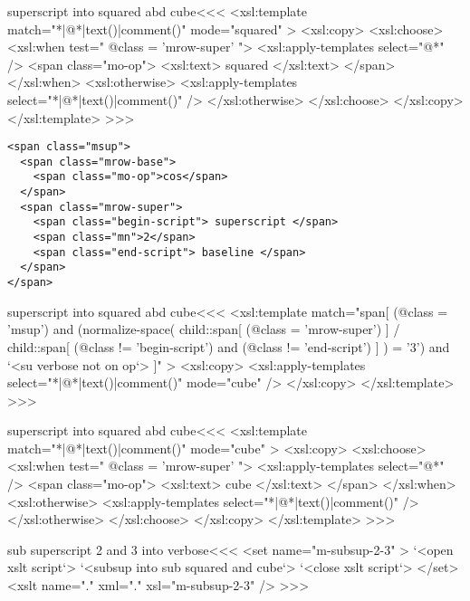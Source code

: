 \documentclass{article}
\begin{document}
\<superscript into squared abd cube\><<<
<xsl:template match="*|@*|text()|comment()" 
                           mode="squared" >
   <xsl:copy>
     <xsl:choose>
        <xsl:when test=" @class = 'mrow-super' ">
           <xsl:apply-templates select="@*" />
           <span class="mo-op">
             <xsl:text> squared </xsl:text>
           </span>
        </xsl:when>  
        <xsl:otherwise>
           <xsl:apply-templates select="*|@*|text()|comment()" />
        </xsl:otherwise>
     </xsl:choose>
   </xsl:copy>
</xsl:template> 
>>>






\begin{verbatim}
<span class="msup">
  <span class="mrow-base">
    <span class="mo-op">cos</span>
  </span>
  <span class="mrow-super">
    <span class="begin-script"> superscript </span>
    <span class="mn">2</span>
    <span class="end-script"> baseline </span>
  </span>
</span>
\end{verbatim}




\<superscript into squared abd cube\><<<
<xsl:template match="span[
    (@class = 'msup') 
  and
    (normalize-space(
      child::span[ (@class = 'mrow-super') ] 
        / child::span[ (@class != 'begin-script')
                       and
                       (@class != 'end-script')
                     ]
     ) = '3')
  and `<su verbose not on op`>
]" >
   <xsl:copy>
      <xsl:apply-templates select="*|@*|text()|comment()" 
                           mode="cube" />
   </xsl:copy>
</xsl:template> 
>>>



\<superscript into squared abd cube\><<<
<xsl:template match="*|@*|text()|comment()" 
                           mode="cube" >
   <xsl:copy>
     <xsl:choose>
        <xsl:when test=" @class = 'mrow-super' ">
           <xsl:apply-templates select="@*" />
           <span class="mo-op">
             <xsl:text> cube </xsl:text>
           </span>
        </xsl:when>  
        <xsl:otherwise>
           <xsl:apply-templates select="*|@*|text()|comment()" />
        </xsl:otherwise>
     </xsl:choose>
   </xsl:copy>
</xsl:template> 
>>>


\<sub superscript 2 and 3 into verbose\><<<
<set name="m-subsup-2-3" >
  `<open xslt script`>
  `<subsup into sub squared and cube`> 
  `<close xslt script`>
</set>
<xslt name="." xml="." xsl="m-subsup-2-3" />
>>>
\end{document}
